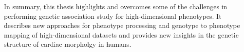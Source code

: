 \begin{singlespace}
In summary, this thesis highlights and overcomes some of the challenges in performing genetic association study for high-dimensional phenotypes. It describes new approaches for phenotype processing and genotype to phenotype mapping of high-dimensional datasets and provides new insights in the genetic structure of cardiac morpholgy in humans.


\end{singlespace}


